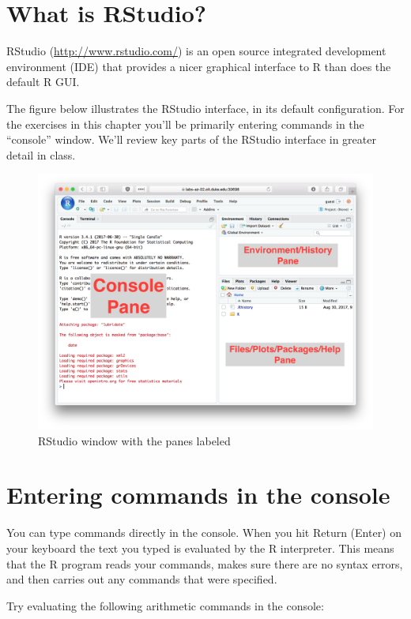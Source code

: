 \documentclass[]{book}
\theoremstyle{definition}
\theoremstyle{definition}
\theoremstyle{definition}
\theoremstyle{remark}
\begin{document}
\hypertarget{what-is-rstudio}{%
\section{What is RStudio?}\label{what-is-rstudio}}

RStudio (\url{http://www.rstudio.com/}) is an open source integrated
development environment (IDE) that provides a nicer graphical interface
to R than does the default R GUI.

The figure below illustrates the RStudio interface, in its default
configuration. For the exercises in this chapter you'll be primarily
entering commands in the ``console'' window. We'll review key parts of
the RStudio interface in greater detail in class.

\begin{figure}

{\centering \includegraphics[width=0.6\linewidth]{./figures/fig-rstudio-panes-labeled} 

}

\caption{RStudio window with the panes labeled}\label{fig:unnamed-chunk-30}
\end{figure}

\hypertarget{entering-commands-in-the-console}{%
\section{Entering commands in the
console}\label{entering-commands-in-the-console}}

You can type commands directly in the console. When you hit Return
(Enter) on your keyboard the text you typed is evaluated by the R
interpreter. This means that the R program reads your commands, makes
sure there are no syntax errors, and then carries out any commands that
were specified.

Try evaluating the following arithmetic commands in the console:
\end{document}
